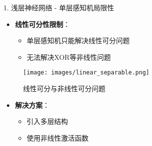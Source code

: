 \documentclass[
  ignorenonframetext,
  aspectratio=169,
  chinese-hans,
]{beamer}
\providecommand{\tightlist}{%
  \setlength{\itemsep}{0pt}\setlength{\parskip}{0pt}}\usepackage{longtable,booktabs,array}
\begin{document}
\begin{frame}{1. 浅层神经网络 - 单层感知机局限性}
\label{ux6d45ux5c42ux795eux7ecfux7f51ux7edc---ux5355ux5c42ux611fux77e5ux673aux5c40ux9650ux6027}
\begin{itemize}
\tightlist
\item
  \textbf{线性可分性限制}：

  \begin{itemize}
  \tightlist
  \item
    单层感知机只能解决线性可分问题
  \item
    无法解决XOR等非线性问题
  \end{itemize}
\end{itemize}

\begin{figure}[H]

{\centering \texttt{[image: images/linear\_separable.png]}

}

\caption{线性可分与非线性可分问题}

\end{figure}%

\begin{itemize}
\tightlist
\item
  \textbf{解决方案}：

  \begin{itemize}
  \tightlist
  \item
    引入多层结构
  \item
    使用非线性激活函数
  \end{itemize}
\end{itemize}
\end{frame}
\end{document}
